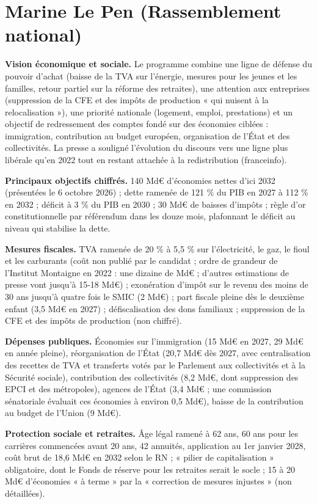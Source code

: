 \documentclass[
  11pt,
  11pt,
  a4paper,
  openany]{book}
\begin{document}
\hypertarget{sec:prog-rn}{%
\section{Marine Le Pen (Rassemblement national)}\label{sec:prog-rn}}

\textbf{Vision économique et sociale.} Le programme combine une ligne de
défense du pouvoir d'achat (baisse de la TVA sur l'énergie, mesures pour
les jeunes et les familles, retour partiel sur la réforme des
retraites), une attention aux entreprises (suppression de la CFE et des
impôts de production « qui nuisent à la relocalisation »), une priorité
nationale (logement, emploi, prestations) et un objectif de redressement
des comptes fondé sur des économies ciblées : immigration, contribution
au budget européen, organisation de l'État et des collectivités. La
presse a souligné l'évolution du discours vers une ligne plus libérale
qu'en 2022 tout en restant attachée à la redistribution (franceinfo).

\textbf{Principaux objectifs chiffrés.} 140 Md€ d'économies nettes d'ici
2032 (présentées le 6 octobre 2026) ; dette ramenée de 121 \% du PIB en
2027 à 112 \% en 2032 ; déficit à 3 \% du PIB en 2030 ; 30 Md€ de
baisses d'impôts ; règle d'or constitutionnelle par référendum dans les
douze mois, plafonnant le déficit au niveau qui stabilise la dette.

\textbf{Mesures fiscales.} TVA ramenée de 20 \% à 5,5 \% sur
l'électricité, le gaz, le fioul et les carburants (coût non publié par
le candidat ; ordre de grandeur de l'Institut Montaigne en 2022 : une
dizaine de Md€ ; d'autres estimations de presse vont jusqu'à 15-18 Md€)
; exonération d'impôt sur le revenu des moins de 30 ans jusqu'à quatre
fois le SMIC (2 Md€) ; part fiscale pleine dès le deuxième enfant (3,5
Md€ en 2027) ; défiscalisation des dons familiaux ; suppression de la
CFE et des impôts de production (non chiffré).

\textbf{Dépenses publiques.} Économies sur l'immigration (15 Md€ en
2027, 29 Md€ en année pleine), réorganisation de l'État (20,7 Md€ dès
2027, avec centralisation des recettes de TVA et transferts votés par le
Parlement aux collectivités et à la Sécurité sociale), contribution des
collectivités (8,2 Md€, dont suppression des EPCI et des métropoles),
agences de l'État (3,4 Md€ ; une commission sénatoriale évaluait ces
économies à environ 0,5 Md€), baisse de la contribution au budget de
l'Union (9 Md€).

\textbf{Protection sociale et retraites.} Âge légal ramené à 62 ans, 60
ans pour les carrières commencées avant 20 ans, 42 annuités, application
au 1er janvier 2028, coût brut de 18,6 Md€ en 2032 selon le RN ; «
pilier de capitalisation » obligatoire, dont le Fonds de réserve pour
les retraites serait le socle ; 15 à 20 Md€ d'économies « à terme » par
la « correction de mesures injustes » (non détaillées).
\end{document}
